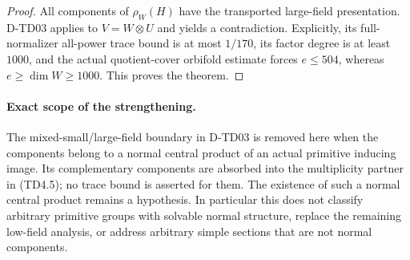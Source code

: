 \begin{proof}
All components of $\rho_W(H)$ have the transported large-field
presentation.  D-TD03 applies to $V=W\otimes U$ and yields a
contradiction.  Explicitly, its full-normalizer all-power trace
bound is at most $1/170$, its factor degree is at least $1000$,
and the actual quotient-cover orbifold estimate forces
$e\le504$, whereas $e\ge\dim W\ge1000$.
This proves the theorem.
\end{proof}

\paragraph{Exact scope of the strengthening.}
The mixed-small/large-field boundary in D-TD03 is removed here
when the components belong to a normal central product of an
actual primitive inducing image.  Its complementary components
are absorbed into the multiplicity partner in (TD4.5); no trace
bound is asserted for them.  The existence of such a normal
central product remains a hypothesis.  In particular this does
not classify arbitrary primitive groups with solvable normal
structure, replace the remaining low-field analysis, or address
arbitrary simple sections that are not normal components.

